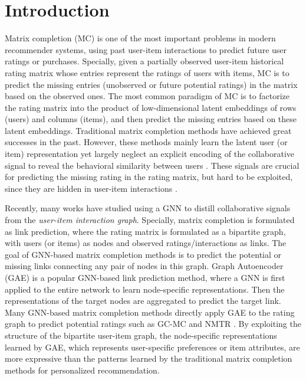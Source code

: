 \documentclass[sigconf]{acmart}
\begin{document}

\maketitle
\section{Introduction}
Matrix completion (MC) \cite{mnih2008probabilistic, kalofolias2014matrix,dziugaite2015neural} is one of the most important problems in modern recommender systems, using past user-item interactions to predict future user ratings or purchases. Specially, given a partially observed user-item historical rating matrix whose entries represent the ratings of users with items, MC is to predict the missing entries (unobserved or future potential ratings) in the matrix based on the observed ones. The most common paradigm of MC is to factorize the rating matrix into the product of low-dimensional latent embeddings of rows (users) and columns (items), and then predict the missing entries based on these latent embeddings. Traditional matrix completion methods \cite{candes2009exact, dziugaite2015neural} have achieved great successes in the past. However, these methods mainly learn the latent user (or item) representation yet largely neglect an explicit encoding of the collaborative signal to reveal the behavioral similarity between users \cite{wang2019neural}. These signals are crucial for predicting the missing rating in the rating matrix, but hard to be exploited, since they are hidden in user-item interactions \cite{he2020lightgcn}. 

Recently, many works \cite{10.5555/3294996.3295127,berg2017graph,zhang2019inductive, you2020handling} have studied using a GNN to distill collaborative signals from the \emph{user-item interaction graph}. Specially, matrix completion is formulated as link prediction, where the rating matrix is formulated as a bipartite graph, with users (or items) as nodes and observed ratings/interactions as links. 
The goal of GNN-based matrix completion methods is to predict the potential or missing links connecting any pair of nodes in this graph. Graph Autoencoder (GAE) \cite{kipf2016variational} is a popular GNN-based link prediction method, where a GNN is first applied to the entire network to learn node-specific representations. Then the representations of the target nodes are aggregated to predict the target link. Many GNN-based matrix completion methods directly apply GAE to the rating graph to predict potential ratings such as GC-MC and NMTR \cite{berg2017graph, gao2019neural}. By exploiting the structure of the bipartite user-item graph, the node-specific representations learned by GAE, which represents user-specific preferences or item attributes, are more expressive than the patterns learned by the traditional matrix completion methods for personalized recommendation. 
\end{document}

